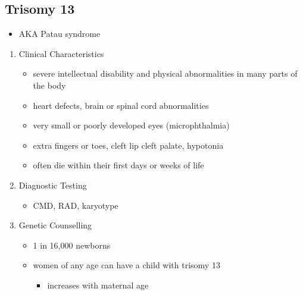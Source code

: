 \documentclass[12pt]{scrartcl}
\begin{document}
\subsection{Trisomy 13}
\label{sec:org939113f}
\begin{itemize}
\item AKA Patau syndrome
\end{itemize}
\begin{enumerate}
\item Clinical Characteristics
\label{sec:org7bcac01}
\begin{itemize}
\item severe intellectual disability and physical abnormalities in many parts of the body
\item heart defects, brain or spinal cord abnormalities
\item very small or poorly developed eyes (microphthalmia)
\item extra fingers or toes, cleft lip \textpm{} cleft palate, hypotonia
\item often die within their first days or weeks of life
\end{itemize}

\item Diagnostic Testing
\label{sec:org7231b37}
\begin{itemize}
\item CMD, RAD, karyotype
\end{itemize}

\item Genetic Counselling
\label{sec:orgebab06d}
\begin{itemize}
\item 1 in 16,000 newborns
\item women of any age can have a child with trisomy 13
\begin{itemize}
\item increases with maternal age
\end{itemize}
\end{itemize}
\end{enumerate}
\end{document}
